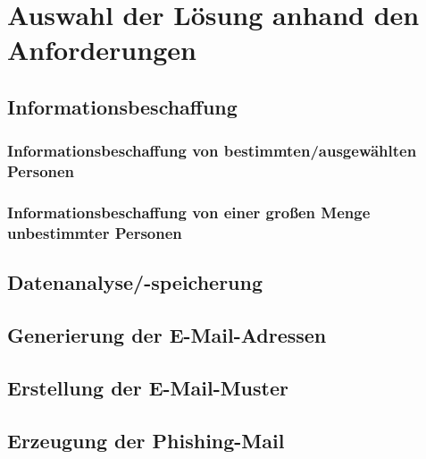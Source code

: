 

\chapter{Auswahl der Lösung anhand den Anforderungen}  %
\label{cha:Auswahl der Lösung anhand Anforderungen} %
\section{Informationsbeschaffung} %
	\subsection{Informationsbeschaffung von bestimmten/ausgewählten Personen}
	
	\subsection{Informationsbeschaffung von einer großen Menge unbestimmter Personen}


\section{Datenanalyse/-speicherung}


\section{Generierung der E-Mail-Adressen}

\section{Erstellung der E-Mail-Muster}

\section{Erzeugung der Phishing-Mail}